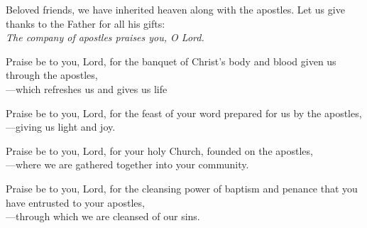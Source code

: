 \intercessions

\begin{raggedright}
Beloved friends, we have inherited heaven along with the apostles. Let us give thanks to the Father for all his gifts:\\
\emph{The company of apostles praises you, O Lord.}

\medskip
Praise be to you, Lord, for the banquet of Christ’s body and blood given us through the apostles,\\
{\color{red}---}which refreshes us and gives us life

\medskip
Praise be to you, Lord, for the feast of your word prepared for us by the apostles,\\
{\color{red}---}giving us light and joy.

\medskip
Praise be to you, Lord, for your holy Church, founded on the apostles,\\
{\color{red}---}where we are gathered together into your community.

\medskip
Praise be to you, Lord, for the cleansing power of baptism and penance that you have entrusted to your apostles,\\
{\color{red}---}through which we are cleansed of our sins.
\end{raggedright}